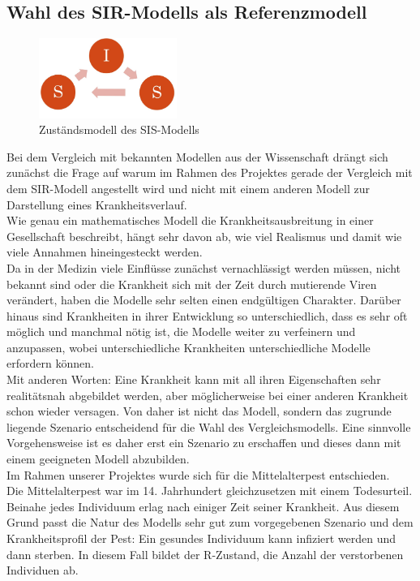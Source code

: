 \subsection*{Wahl des SIR-Modells als Referenzmodell}
\begin{figure}
	\centering
\includegraphics[width= 0.4\textwidth]{./images/SIS-Modell.jpg}\caption{Zuständsmodell des SIS-Modells}\label{fig:sis}
\end{figure}
Bei dem Vergleich mit bekannten Modellen aus der Wissenschaft drängt sich zunächst die Frage auf warum im Rahmen des Projektes gerade der Vergleich mit dem SIR-Modell angestellt wird und nicht mit einem anderen Modell zur Darstellung eines Krankheitsverlauf.\\
Wie genau ein mathematisches Modell die Krankheitsausbreitung in einer Gesellschaft beschreibt, hängt sehr davon ab, wie viel Realismus und damit wie viele Annahmen hineingesteckt werden.\\
Da in der Medizin viele Einflüsse zunächst vernachlässigt werden müssen, nicht bekannt sind oder die Krankheit sich mit der Zeit durch mutierende Viren verändert, haben die Modelle sehr selten einen endgültigen Charakter. Darüber hinaus sind Krankheiten in ihrer Entwicklung so unterschiedlich, dass es sehr oft möglich und manchmal nötig ist, die Modelle weiter zu verfeinern und anzupassen, wobei unterschiedliche Krankheiten unterschiedliche Modelle erfordern können. 
\cite{sebM}\\
Mit anderen Worten: Eine Krankheit kann mit all ihren Eigenschaften sehr realitätsnah abgebildet werden, aber möglicherweise bei einer anderen Krankheit schon wieder versagen. Von daher ist nicht das Modell, sondern das zugrunde liegende Szenario entscheidend für die Wahl des Vergleichsmodells. Eine sinnvolle Vorgehensweise ist es daher erst ein Szenario zu erschaffen und dieses dann mit einem geeigneten Modell abzubilden.\\ 
Im Rahmen unserer Projektes wurde sich für die Mittelalterpest entschieden.\\ 
Die Mittelalterpest war im 14. Jahrhundert gleichzusetzen mit einem Todesurteil. Beinahe jedes Individuum erlag nach einiger Zeit seiner Krankheit. Aus diesem Grund passt die Natur des Modells sehr gut zum vorgegebenen Szenario und dem Krankheitsprofil der Pest: Ein gesundes Individuum kann infiziert werden und dann sterben. In diesem Fall bildet der \glqq R\grqq-Zustand, die Anzahl der verstorbenen Individuen ab.\\
